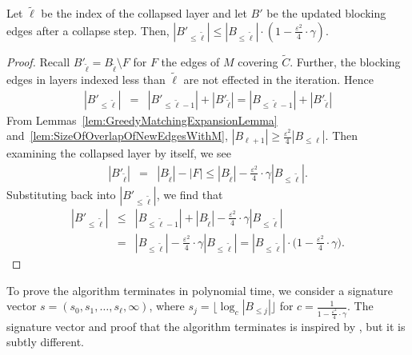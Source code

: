 \begin{lemma}\label{lem:ExtraSteps}
  Let $\tilde{\ell}$ be the index of the collapsed layer and let $B'$ be the updated blocking edges after a collapse step. Then,
  $|B'_{\leq \tilde{\ell}}| \leq |B_{\leq \tilde{\ell}}| \cdot (1- \frac{\varepsilon^2}{4} \cdot \gamma )$.
\end{lemma}
\begin{proof}
 Recall $B'_{\tilde{\ell}} = B_{\tilde{\ell}} \setminus F$ for $F$ the edges of $M$ covering $\tilde{C}$. Further, the blocking edges in layers indexed less than $\tilde{\ell}$ are not effected in the iteration. Hence
 \begin{eqnarray*}
  |B'_{\leq \tilde{\ell}}| &=& |B'_{\leq \tilde{\ell}-1}| + |B'_{ \tilde{\ell}}|=|B_{\leq \tilde{\ell}-1}| + |B'_{ \tilde{\ell}}| 
\end{eqnarray*}
From Lemmas~\ref{lem:GreedyMatchingExpansionLemma} and~\ref{lem:SizeOfOverlapOfNewEdgesWithM},
$|B_{\ell+1}| \geq \frac{\varepsilon^2}{4}|B_{\leq \ell}|$. Then examining the collapsed layer by itself, we see 
\begin{eqnarray*}
  |B'_{ \tilde{\ell}}| &=& |B_{ \tilde{\ell}}|-|F| \leq |B_{ \tilde{\ell}}| -   \frac{\varepsilon^2}{4} \cdot \gamma |B_{ \leq \tilde{\ell}}|.
\end{eqnarray*}
Substituting back into $|B'_{\leq \tilde{\ell}}|$, we find that
\begin{eqnarray*} 
  |B'_{\leq \tilde{\ell}}| &\leq& |B_{\leq \tilde{\ell}-1}| + |B_{ \tilde{\ell}}| -  \frac{\varepsilon^2}{4} \cdot \gamma |B_{ \leq \tilde{\ell}}| \\
  &=& |B_{\leq \tilde{\ell}}| - \frac{\varepsilon^2}{4} \cdot \gamma |B_{ \leq \tilde{\ell}}| =|B_{ \leq \tilde{\ell}}| 
  \cdot \big (1-\frac{\varepsilon^2}{4} \cdot \gamma \big).
\end{eqnarray*}
\end{proof}

To prove the algorithm terminates in polynomial time, we consider a signature vector $s = (s_0,s_1,\ldots, s_{\ell}, \infty)$, 
where $s_j = \lfloor \log_{c}|B_{\leq j}| \rfloor $ for $c = \frac{1}{1-\frac{\varepsilon^2 }{4}\cdot \gamma}$. 
The signature vector and proof that the algorithm terminates is inspired by \cite{AlgoForSantaClaus-AnnamalaiKalaitzisSvenssonSODA15}, 
but it is subtly different. 


